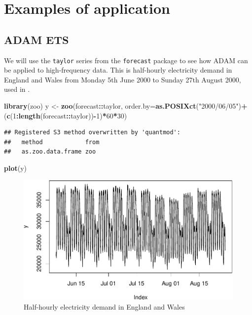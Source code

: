 \documentclass[]{book}
\newenvironment{Shaded}{\begin{snugshade}}{\end{snugshade}}
\newcommand{\DataTypeTok}[1]{\textcolor[rgb]{0.13,0.29,0.53}{#1}}
\newcommand{\DecValTok}[1]{\textcolor[rgb]{0.00,0.00,0.81}{#1}}
\newcommand{\KeywordTok}[1]{\textcolor[rgb]{0.13,0.29,0.53}{\textbf{#1}}}
\newcommand{\NormalTok}[1]{#1}
\newcommand{\OperatorTok}[1]{\textcolor[rgb]{0.81,0.36,0.00}{\textbf{#1}}}
\newcommand{\StringTok}[1]{\textcolor[rgb]{0.31,0.60,0.02}{#1}}
\theoremstyle{definition}
\theoremstyle{definition}
\theoremstyle{definition}
\theoremstyle{definition}
\theoremstyle{remark}
\begin{document}
\hypertarget{ADAMMultipleFrequenciesExamples}{%
\section{Examples of application}\label{ADAMMultipleFrequenciesExamples}}

\hypertarget{adam-ets}{%
\subsection{ADAM ETS}\label{adam-ets}}

We will use the \texttt{taylor} series from the \texttt{forecast} package to see how ADAM can be applied to high-frequency data. This is half-hourly electricity demand in England and Wales from Monday 5th June 2000 to Sunday 27th August 2000, used in \citet{Taylor2003a}.

\begin{Shaded}
\begin{Highlighting}[]
\KeywordTok{library}\NormalTok{(zoo)}
\NormalTok{y <-}\StringTok{ }\KeywordTok{zoo}\NormalTok{(forecast}\OperatorTok{::}\NormalTok{taylor,}
         \DataTypeTok{order.by=}\KeywordTok{as.POSIXct}\NormalTok{(}\StringTok{"2000/06/05"}\NormalTok{)}\OperatorTok{+}
\StringTok{           }\NormalTok{(}\KeywordTok{c}\NormalTok{(}\DecValTok{1}\OperatorTok{:}\KeywordTok{length}\NormalTok{(forecast}\OperatorTok{::}\NormalTok{taylor))}\OperatorTok{-}\DecValTok{1}\NormalTok{)}\OperatorTok{*}\DecValTok{60}\OperatorTok{*}\DecValTok{30}\NormalTok{)}
\end{Highlighting}
\end{Shaded}

\begin{verbatim}
## Registered S3 method overwritten by 'quantmod':
##   method            from
##   as.zoo.data.frame zoo
\end{verbatim}

\begin{Shaded}
\begin{Highlighting}[]
\KeywordTok{plot}\NormalTok{(y)}
\end{Highlighting}
\end{Shaded}

\begin{figure}
\centering
\includegraphics{Svetunkov--2022----ADAM_files/figure-latex/taylorSeries-1.pdf}
\caption{\label{fig:taylorSeries}Half-hourly electricity demand in England and Wales}
\end{figure}
\end{document}
